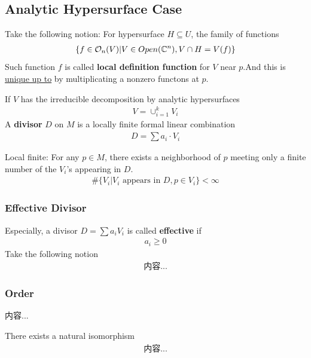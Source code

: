 \documentclass[Total.tex]{subfiles}
\begin{document}
			\subsection{Analytic Hypersurface Case}
				Take the following notion: For hypersurface $H\subseteq U$, the family of functions
				\begin{gather*}
					\{f\in \mathcal{O}_n(V)|V\in Open(\mathbb{C}^n),V\cap H=V(f)\}
				\end{gather*}
				Such function $f$ is called \textbf{local definition function} for $V$ near $p$.And this is \underline{unique up to} by multiplicating a nonzero functons at $p$.
				\begin{Def}
					If $V$ has the irreducible decomposition by analytic hypersurfaces
					\begin{gather*}
						V=\cup_{i=1}^k V_i
					\end{gather*}
					A \textbf{divisor} $D$ on $M$ is a locally finite formal linear combination 
					\begin{gather*}
						D=\sum a_i\cdot V_i
					\end{gather*}
					
					Local finite: For any $p\in M$, there exists a neighborhood of $p$ meeting only a finite number of the $V_i$'s appearing in $D$.
					\begin{gather*}
						\#\{V_i|V_i\mbox{ appears in }D,p\in V_i\}<\infty
					\end{gather*}
				\end{Def}
				\subsubsection{Effective Divisor}
				\begin{Def}
					Especially, a divisor $D=\sum a_i V_i$ is called \textbf{effective} if
					\begin{gather*}
						a_i\geq 0
					\end{gather*}
					Take the following notion
					\begin{gather*}
						内容...
					\end{gather*}
				\end{Def}
				\subsubsection{Order}
				\begin{Def}
					内容...
				\end{Def}
				\begin{proposition}
					There exists a natural isomorphism
					\begin{gather*}
						内容...
					\end{gather*}
				\end{proposition}
\end{document}
